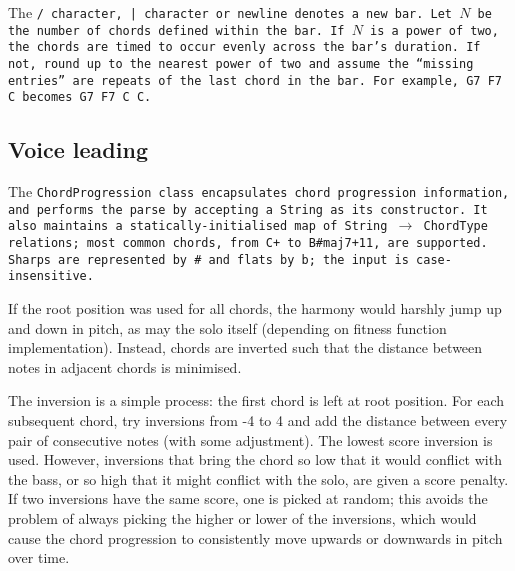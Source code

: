 The \tt{/} character, \tt{|} character or newline denotes a new bar. Let $N$ be the number of chords defined within the bar. If $N$ is a power of two, the chords are timed to occur evenly across the bar's duration. If not, round up to the nearest power of two and assume the ``missing entries'' are repeats of the last chord in the bar. For example, \tt{G7 F7 C} becomes \tt{G7 F7 C C}.

\subsection{Voice leading}

The \tt{ChordProgression} class encapsulates chord progression information, and performs the parse by accepting a \tt{String} as its constructor. It also maintains a statically-initialised map of \tt{String} $\to$ \tt{ChordType} relations; most common chords, from \tt{C+} to \tt{B\#maj7+11}, are supported. Sharps are represented by \tt{\#} and flats by \tt{b}; the input is case-insensitive.

If the root position was used for all chords, the harmony would harshly jump up and down in pitch, as may the solo itself (depending on fitness function implementation). Instead, chords are inverted such that the distance between notes in adjacent chords is minimised.

The inversion is a simple process: the first chord is left at root position. For each subsequent chord, try inversions from -4 to 4 and add the distance between every pair of consecutive notes (with some adjustment). The lowest score inversion is used. However, inversions that bring the chord so low that it would conflict with the bass, or so high that it might conflict with the solo, are given a score penalty. If two inversions have the same score, one is picked at random; this avoids the problem of always picking the higher or lower of the inversions, which would cause the chord progression to consistently move upwards or downwards in pitch over time.